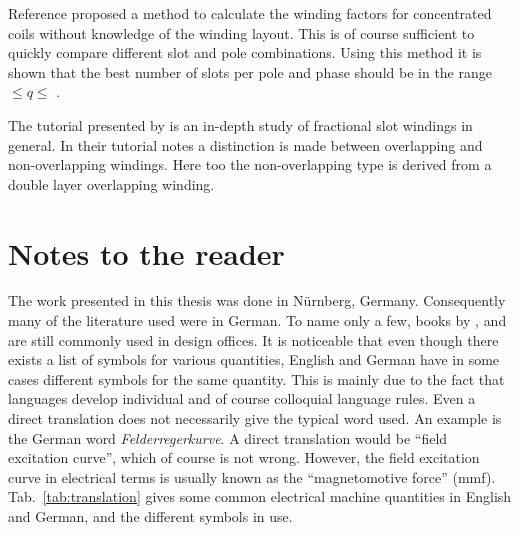 Reference \cite{REF-00756} proposed a method to calculate the winding factors for concentrated coils without knowledge of the winding layout. This is of course sufficient to quickly compare different slot and pole combinations. Using this method it is shown that the best number of slots per pole and phase should be in the range \textonequarter $\leq q\leq$ \textonehalf. 

The tutorial presented by \cite{REF-01056} is an in-depth study of fractional slot windings in general. In their tutorial notes a distinction is made between overlapping and non-overlapping windings. Here too the non-overlapping type is derived from a double layer overlapping winding. 

\section{Notes to the reader}
The work presented in this thesis was done in Nürnberg, Germany. Consequently many of the literature used were in German. To name only a few, books by \cite{REF-00004}, \cite{REF-00429} and \cite{REF-00294} are still commonly used in design offices. It is noticeable that even though there exists a list of symbols for various quantities, English and German have in some cases different symbols for the same quantity. This is mainly due to the fact that languages develop individual and of course colloquial language rules. Even a direct translation does not necessarily give the typical word used. An example is the German word \textit{Felderregerkurve}. A direct translation would be ``field excitation curve'', which of course is not wrong. However, the field excitation curve in electrical terms is usually known as the ``magnetomotive force'' (mmf). Tab.~\ref{tab:translation} gives some common electrical machine quantities in English and German, and the different symbols in use.
